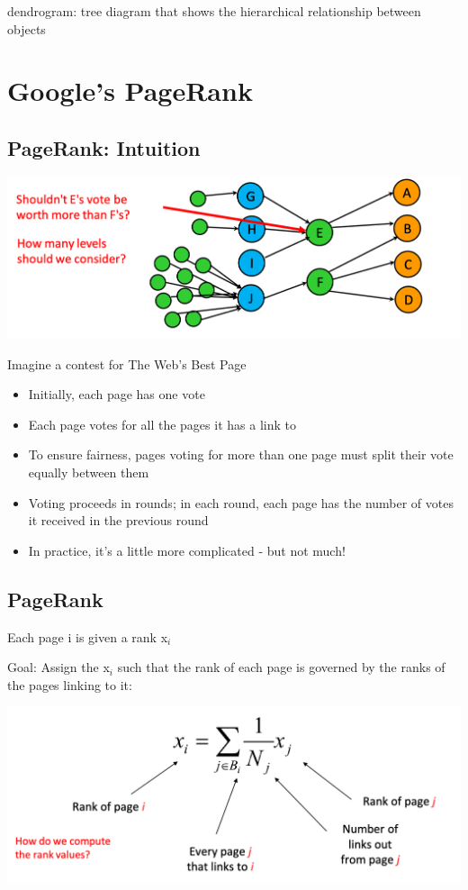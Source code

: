 \documentclass[11pt]{article}
\theoremstyle{definition}
\begin{document}
dendrogram: tree diagram that shows the hierarchical relationship between objects



\section{Google's PageRank}
\subsection{PageRank: Intuition}
\includegraphics[width=\textwidth/2]{25.png}

Imagine a contest for The Web's Best Page

\begin{itemize}
    \item Initially, each page has one vote
    \item Each page votes for all the pages it has a link to
    \item To ensure fairness, pages voting for more than one page must split
    their vote equally between them
    \item Voting proceeds in rounds; in each round, each page has the number
    of votes it received in the previous round
    \item In practice, it's a little more complicated - but not much!
\end{itemize}

\subsection{PageRank}
Each page i is given a rank x$_i$

Goal: Assign the x$_i$ such that the rank of each page is
governed by the ranks of the pages linking to it:

\includegraphics[width=\textwidth/2]{26.png}
\end{document}
